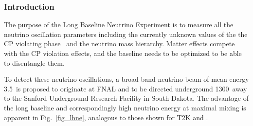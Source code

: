 
\subsubsection{Introduction}

The purpose of the Long Baseline Neutrino Experiment is to measure all the neutrino oscillation parameters including the currently unknown values of the the CP violating  phase \deltacp\ and the neutrino mass hierarchy.  Matter effects compete with the 
CP violation effects, and the baseline needs to be optimized to be able to disentangle them. 

To detect these neutrino oscillations, a  broad-band neutrino beam  of
mean energy 3.5\gev\ is proposed to originate at FNAL and to be
directed underground 1300\km\ away to the Sanford Underground Research
Facility in South Dakota.  The advantage of the long baseline and
correspondingly high neutrino energy at maximal mixing is apparent in
Fig.~\ref{fig_lbne}, analogous to those shown for T2K and \NOvA. 


